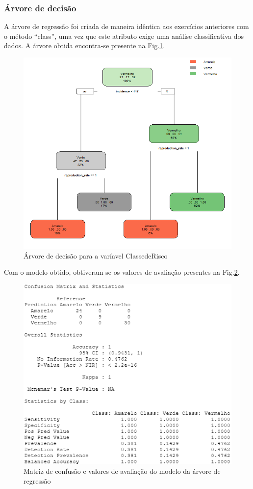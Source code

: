 \documentclass[conference]{IEEEtran}
\begin{document}
\subsubsection{Árvore de decisão}
A árvore de regressão foi criada de maneira idêntica aos exercícios anteriores com o método “class”, uma vez que este atributo exige uma análise classificativa dos dados. A árvore obtida encontra-se presente na Fig.\ref{8a_rpart}.
\begin{figure}[htbp]
\centerline{\includegraphics[width=0.95\columnwidth]{images/08_1.png}}
\caption{Árvore de decisão para a varíavel ClassedeRisco}
\label{8a_rpart}
\end{figure}
Com o modelo obtido, obtiveram-se os valores de avaliação presentes na Fig.\ref{8a_confusionmatrix}.
\begin{figure}[htbp]
\centerline{\includegraphics[width=0.95\columnwidth]{images/08_2.png}}
\caption{Matriz de confusão e valores de avaliação do modelo da árvore de regressão}
\label{8a_confusionmatrix}
\end{figure}
\end{document}
